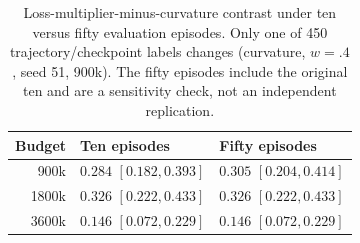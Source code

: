 \begin{table}[t]
\centering\small
\caption{Loss-multiplier-minus-curvature contrast under ten versus fifty evaluation episodes. Only one of 450 trajectory/checkpoint labels changes (curvature, $w=.4$, seed 51, 900k). The fifty episodes include the original ten and are a sensitivity check, not an independent replication.}
\label{tab:confirmed_eval}
\begin{tabular}{@{}rll@{}}\toprule
Budget & Ten episodes & Fifty episodes \\
\midrule
900k & $0.284$ $[0.182,0.393]$ & $0.305$ $[0.204,0.414]$ \\
1800k & $0.326$ $[0.222,0.433]$ & $0.326$ $[0.222,0.433]$ \\
3600k & $0.146$ $[0.072,0.229]$ & $0.146$ $[0.072,0.229]$ \\
\bottomrule\end{tabular}
\end{table}
